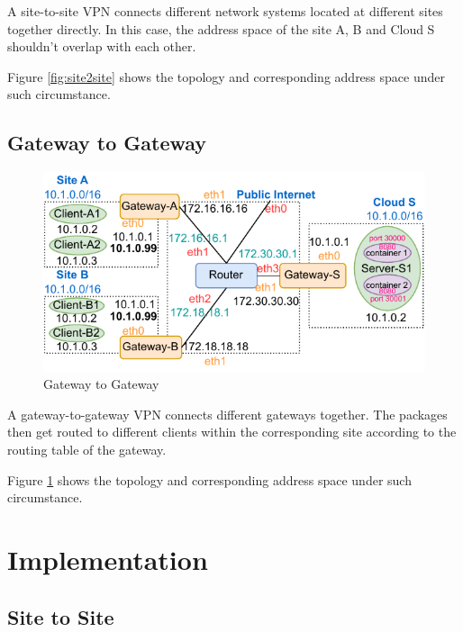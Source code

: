 \documentclass[article]{aaltoseries}
\begin{document}
A site-to-site VPN connects different network systems located at different sites together directly. In this case, the address space of the site A, B and Cloud S shouldn't overlap with each other.

Figure \ref{fig:site2site} shows the topology and corresponding address space under such circumstance.

\subsection{Gateway to Gateway}
\begin{figure}[t!]
  \begin{center}
    \includegraphics[width=1.1\textwidth]{figures/host-to-host.pdf}
    \caption{Gateway to Gateway}
    \label{fig:gateway2gateway}
  \end{center}
\end{figure}

A gateway-to-gateway VPN connects different gateways together. The packages then get routed to different clients within the corresponding site according to the routing table of the gateway.

Figure \ref{fig:gateway2gateway} shows the topology and corresponding address space under such circumstance.



\section{Implementation}



\subsection{Site to Site}
\end{document}
